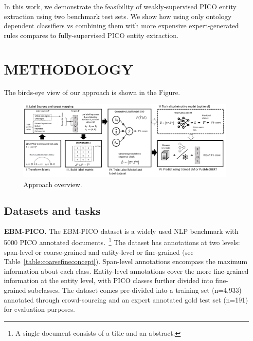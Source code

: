 \documentclass[10.7pt,]{article}
\begin{document}
In this work, we demonstrate the feasibility of weakly-supervised PICO entity extraction using two benchmark test sets.
We show how using only ontology dependent classifiers vs combining them with more expensive expert-generated rules compares to fully-supervised PICO entity extraction.
%
%
%
\section{METHODOLOGY}\label{methods}
%
The birds-eye view of our approach is shown in the Figure.

\begin{figure}[t]
\centering
\includegraphics[width=0.98\textwidth]{figures/approach.pdf}
\caption{Approach overview.}
\label{fig:approach}
\end{figure}
%
%
%
\subsection{Datasets and tasks}\label{data}
%
\textbf{EBM-PICO.}
The EBM-PICO dataset is a widely used NLP benchmark with 5000 PICO annotated documents.~\footnote{A single document consists of a title and an abstract.}
The dataset has annotations at two levels: span-level or coarse-grained and entity-level or fine-grained (see Table~\ref{table:coarsefineconcept}).
Span-level annotations encompass the maximum information about each class.
Entity-level annotations cover the more fine-grained information at the entity level, with PICO classes further divided into fine-grained subclasses.
The dataset comes pre-divided into a training set (n=4,933) annotated through crowd-sourcing and an expert annotated gold test set (n=191) for evaluation purposes.
\end{document}
